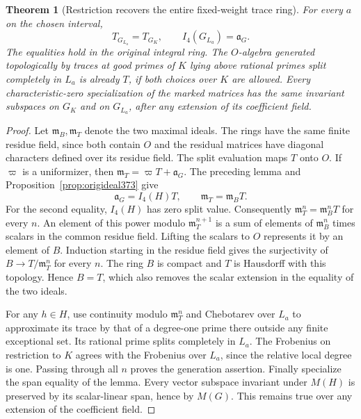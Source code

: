 \documentclass[a4paper,11pt]{article}
\newtheorem{theorem}[proposition]{Theorem}
\theoremstyle{definition}
\theoremstyle{remark}
\numberwithin{equation}{section}
\begin{document}
\begin{theorem}[Restriction recovers the entire fixed-weight trace ring]
\label{thm:restrictedtrace374}
For every \(a\) on the chosen interval,
\[
            T_{G_{L_a}}=T_{G_K},\qquad
            I_4(G_{L_a})=\mathfrak a_G .
\]
The equalities hold in the original integral ring. The
\(O\)-algebra generated topologically by traces at good
primes of \(K\) lying above rational primes split completely
in \(L_a\) is already \(T\), if both choices over \(K\) are
allowed. Every characteristic-zero specialization of the
marked matrices has the same invariant subspaces on \(G_K\)
and on \(G_{L_a}\), after any extension of its coefficient field.
\end{theorem}
\begin{proof}
Let \(\mathfrak m_B,\mathfrak m_T\) denote the two maximal
ideals. The rings have the same finite residue field, since
both contain \(O\) and the residual matrices have diagonal
characters defined over its residue field. The split evaluation
maps \(T\) onto \(O\). If \(\varpi\) is a uniformizer, then
\(\mathfrak m_T=\varpi T+\mathfrak a_G\).
The preceding lemma and Proposition~\ref{prop:origideal373}
give
\[
                 \mathfrak a_G=I_4(H)T,\qquad
                 \mathfrak m_T=\mathfrak m_B T .
\]
For the second equality, \(I_4(H)\) has zero split value.
Consequently \(\mathfrak m_T^n=\mathfrak m_B^nT\) for
every \(n\). An element of this power modulo
\(\mathfrak m_T^{n+1}\) is a sum of elements of
\(\mathfrak m_B^n\) times scalars in the common residue field.
Lifting the scalars to \(O\) represents it by an element of
\(B\). Induction starting in the residue field gives the
surjectivity of \(B\to T/\mathfrak m_T^n\) for every \(n\).
The ring \(B\) is compact and \(T\) is Hausdorff with this
topology. Hence \(B=T\), which also removes the scalar
extension in the equality of the two ideals.

For any \(h\in H\), use continuity modulo
\(\mathfrak m_T^n\) and Chebotarev over \(L_a\) to approximate
its trace by that of a degree-one prime there outside any
finite exceptional set. Its rational prime splits completely
in \(L_a\). The Frobenius on restriction to \(K\) agrees with
the Frobenius over \(L_a\), since the relative local degree
is one. Passing through all \(n\) proves the generation
assertion. Finally specialize the span equality of the
lemma. Every vector subspace invariant under \(M(H)\) is
preserved by its scalar-linear span, hence by \(M(G)\).
This remains true over any extension of the coefficient field.
\end{proof}
\end{document}
